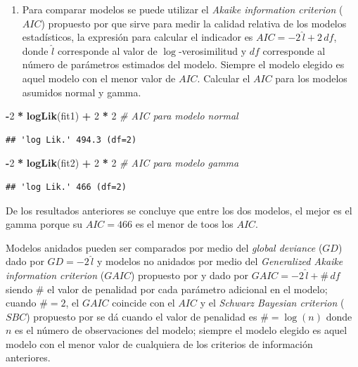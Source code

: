 \documentclass[10pt,]{krantz}
\makeatletter
\newenvironment{Shaded}{\begin{snugshade}}{\end{snugshade}}
\newcommand{\KeywordTok}[1]{\textcolor[rgb]{0.13,0.29,0.53}{\textbf{#1}}}
\newcommand{\DecValTok}[1]{\textcolor[rgb]{0.00,0.00,0.81}{#1}}
\newcommand{\StringTok}[1]{\textcolor[rgb]{0.31,0.60,0.02}{#1}}
\newcommand{\CommentTok}[1]{\textcolor[rgb]{0.56,0.35,0.01}{\textit{#1}}}
\newcommand{\OperatorTok}[1]{\textcolor[rgb]{0.81,0.36,0.00}{\textbf{#1}}}
\newcommand{\NormalTok}[1]{#1}
\providecommand{\tightlist}{%
  \setlength{\itemsep}{0pt}\setlength{\parskip}{0pt}}
\newenvironment{kframe}{%
\medskip{}
\setlength{\fboxsep}{.8em}
 \def\at@end@of@kframe{}%
 \ifinner\ifhmode%
  \def\at@end@of@kframe{\end{minipage}}%
  \begin{minipage}{\columnwidth}%
 \fi\fi%
 \def\FrameCommand##1{\hskip\@totalleftmargin \hskip-\fboxsep
 \colorbox{shadecolor}{##1}\hskip-\fboxsep
     \hskip-\linewidth \hskip-\@totalleftmargin \hskip\columnwidth}%
 \MakeFramed {\advance\hsize-\width
   \@totalleftmargin\z@ \linewidth\hsize
   \@setminipage}}%
 {\par\unskip\endMakeFramed%
 \at@end@of@kframe}
\renewenvironment{Shaded}{\begin{kframe}}{\end{kframe}}
\let\BeginKnitrBlock\begin \let\EndKnitrBlock\end
\makeatother
\begin{document}
\begin{enumerate}
\def\labelenumi{\arabic{enumi})}
\setcounter{enumi}{3}
\tightlist
\item
  Para comparar modelos se puede utilizar el \emph{Akaike information
  criterion} (\(AIC\)) propuesto por \citet{Akaike74} que sirve para
  medir la calidad relativa de los modelos estadísticos, la expresión
  para calcular el indicador es \(AIC=-2 \, \hat{l}+2 \, df\), donde
  \(\hat{l}\) corresponde al valor de \(\log\)-verosimilitud y \(df\)
  corresponde al número de parámetros estimados del modelo. Siempre el
  modelo elegido es aquel modelo con el menor valor de \(AIC\). Calcular
  el \(AIC\) para los modelos asumidos normal y gamma.
\end{enumerate}

\begin{Shaded}
\begin{Highlighting}[]
\OperatorTok{-}\DecValTok{2} \OperatorTok{*}\StringTok{ }\KeywordTok{logLik}\NormalTok{(fit1) }\OperatorTok{+}\StringTok{ }\DecValTok{2} \OperatorTok{*}\StringTok{ }\DecValTok{2}  \CommentTok{# AIC para modelo normal}
\end{Highlighting}
\end{Shaded}

\begin{verbatim}
## 'log Lik.' 494.3 (df=2)
\end{verbatim}

\begin{Shaded}
\begin{Highlighting}[]
\OperatorTok{-}\DecValTok{2} \OperatorTok{*}\StringTok{ }\KeywordTok{logLik}\NormalTok{(fit2) }\OperatorTok{+}\StringTok{ }\DecValTok{2} \OperatorTok{*}\StringTok{ }\DecValTok{2}  \CommentTok{# AIC para modelo gamma}
\end{Highlighting}
\end{Shaded}

\begin{verbatim}
## 'log Lik.' 466 (df=2)
\end{verbatim}

De los resultados anteriores se concluye que entre los dos modelos, el
mejor es el gamma porque su \(AIC=466\) es el menor de toos los \(AIC\).

\BeginKnitrBlock{rmdnote}
Modelos anidados pueden ser comparados por medio del \emph{global
deviance} (\(GD\)) dado por \(GD=-2 \, \hat{l}\) y modelos no anidados
por medio del \emph{Generalized Akaike information criterion} (\(GAIC\))
propuesto por \citet{Akaike83} y dado por
\(GAIC=-2 \, \hat{l} + \# \, df\) siendo \(\#\) el valor de penalidad
por cada parámetro adicional en el modelo; cuando \(\# = 2\), el
\(GAIC\) coincide con el \(AIC\) y el \emph{Schwarz Bayesian criterion}
(\(SBC\)) propuesto por \citet{Schwarz} se dá cuando el valor de
penalidad es \(\# = \log(n)\) donde \(n\) es el número de observaciones
del modelo; siempre el modelo elegido es aquel modelo con el menor valor
de cualquiera de los criterios de información anteriores.
\EndKnitrBlock{rmdnote}
\end{document}
